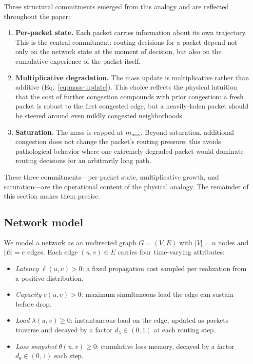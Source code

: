 Three structural commitments emerged from this analogy and are
reflected throughout the paper:

\begin{enumerate}
\item \textbf{Per-packet state.} Each packet carries information
about its own trajectory. This is the central commitment: routing
decisions for a packet depend not only on the network state at the
moment of decision, but also on the cumulative experience of the
packet itself.

\item \textbf{Multiplicative degradation.} The mass update is
multiplicative rather than additive
(Eq.~\ref{eq:mass-update}). This choice reflects the physical
intuition that the cost of further congestion compounds with prior
congestion: a fresh packet is robust to the first congested edge,
but a heavily-laden packet should be steered around even mildly
congested neighborhoods.

\item \textbf{Saturation.} The mass is capped at $m_{\max}$. Beyond
saturation, additional congestion does not change the packet's
routing pressure; this avoids pathological behavior where one
extremely degraded packet would dominate routing decisions for an
arbitrarily long path.
\end{enumerate}

These three commitments---per-packet state, multiplicative growth,
and saturation---are the operational content of the physical
analogy. The remainder of this section makes them precise.

\subsection{Network model}
\label{subsec:network-model}

We model a network as an undirected graph $G=(V,E)$ with $|V|=n$
nodes and $|E|=e$ edges. Each edge $(u,v)\in E$ carries four
time-varying attributes:
\begin{itemize}
\item \emph{Latency} $\ell(u,v) > 0$: a fixed propagation cost
sampled per realization from a positive distribution.
\item \emph{Capacity} $c(u,v) > 0$: maximum simultaneous load
the edge can sustain before drop.
\item \emph{Load} $\lambda(u,v) \ge 0$: instantaneous load on
the edge, updated as packets traverse and decayed by a factor
$d_\lambda \in (0,1)$ at each routing step.
\item \emph{Loss snapshot} $\theta(u,v) \ge 0$: cumulative
loss memory, decayed by a factor $d_\theta \in (0,1)$ each step.
\end{itemize}

